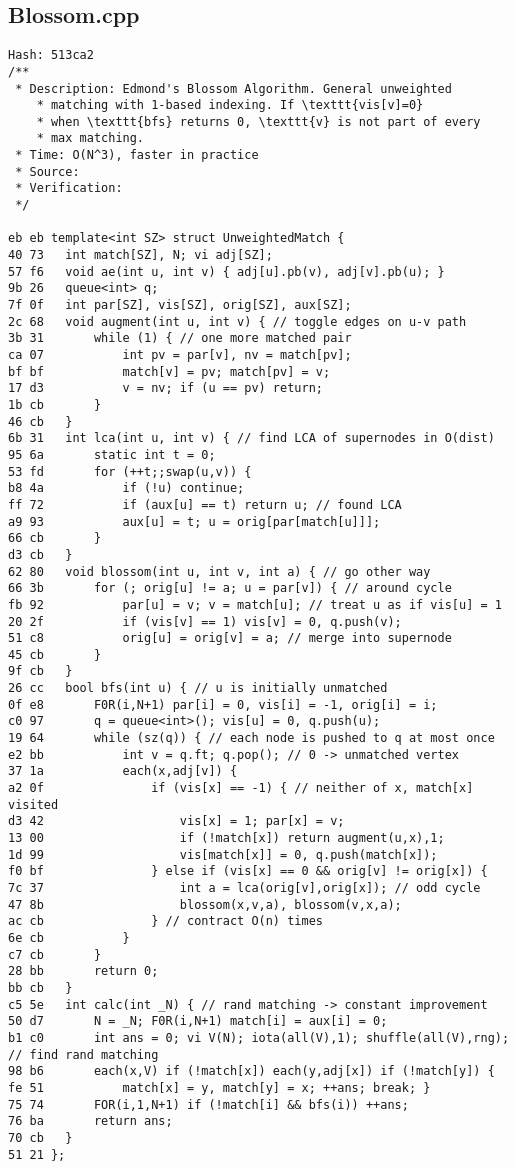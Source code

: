 \documentclass[11pt, a4paper, twoside]{article}
\begin{document}
\subsection{Blossom.cpp}
\begin{lstlisting}
Hash: 513ca2
/**
 * Description: Edmond's Blossom Algorithm. General unweighted 
 	* matching with 1-based indexing. If \texttt{vis[v]=0}
 	* when \texttt{bfs} returns 0, \texttt{v} is not part of every 
 	* max matching.
 * Time: O(N^3), faster in practice
 * Source: 
 * Verification: 
 */

eb eb template<int SZ> struct UnweightedMatch {
40 73 	int match[SZ], N; vi adj[SZ];
57 f6 	void ae(int u, int v) { adj[u].pb(v), adj[v].pb(u); }
9b 26 	queue<int> q;
7f 0f 	int par[SZ], vis[SZ], orig[SZ], aux[SZ];
2c 68 	void augment(int u, int v) { // toggle edges on u-v path
3b 31 		while (1) { // one more matched pair
ca 07 			int pv = par[v], nv = match[pv];
bf bf 			match[v] = pv; match[pv] = v;
17 d3 			v = nv; if (u == pv) return;
1b cb 		}
46 cb 	}
6b 31 	int lca(int u, int v) { // find LCA of supernodes in O(dist)
95 6a 		static int t = 0;
53 fd 		for (++t;;swap(u,v)) {
b8 4a 			if (!u) continue;
ff 72 			if (aux[u] == t) return u; // found LCA
a9 93 			aux[u] = t; u = orig[par[match[u]]];
66 cb 		}
d3 cb 	}
62 80 	void blossom(int u, int v, int a) { // go other way
66 3b 		for (; orig[u] != a; u = par[v]) { // around cycle
fb 92 			par[u] = v; v = match[u]; // treat u as if vis[u] = 1
20 2f 			if (vis[v] == 1) vis[v] = 0, q.push(v);
51 c8 			orig[u] = orig[v] = a; // merge into supernode
45 cb 		}
9f cb 	}
26 cc 	bool bfs(int u) { // u is initially unmatched
0f e8 		F0R(i,N+1) par[i] = 0, vis[i] = -1, orig[i] = i;
c0 97 		q = queue<int>(); vis[u] = 0, q.push(u);
19 64 		while (sz(q)) { // each node is pushed to q at most once
e2 bb 			int v = q.ft; q.pop(); // 0 -> unmatched vertex
37 1a 			each(x,adj[v]) {
a2 0f 				if (vis[x] == -1) { // neither of x, match[x] visited
d3 42 					vis[x] = 1; par[x] = v;
13 00 					if (!match[x]) return augment(u,x),1;
1d 99 					vis[match[x]] = 0, q.push(match[x]);
f0 bf 				} else if (vis[x] == 0 && orig[v] != orig[x]) {
7c 37 					int a = lca(orig[v],orig[x]); // odd cycle
47 8b 					blossom(x,v,a), blossom(v,x,a); 
ac cb 				} // contract O(n) times
6e cb 			}
c7 cb 		}
28 bb 		return 0;
bb cb 	}
c5 5e 	int calc(int _N) { // rand matching -> constant improvement
50 d7 		N = _N; F0R(i,N+1) match[i] = aux[i] = 0; 
b1 c0 		int ans = 0; vi V(N); iota(all(V),1); shuffle(all(V),rng); // find rand matching
98 b6 		each(x,V) if (!match[x]) each(y,adj[x]) if (!match[y]) { 
fe 51 			match[x] = y, match[y] = x; ++ans; break; }
75 74 		FOR(i,1,N+1) if (!match[i] && bfs(i)) ++ans;
76 ba 		return ans;
70 cb 	}
51 21 };
\end{lstlisting}
\end{document}
